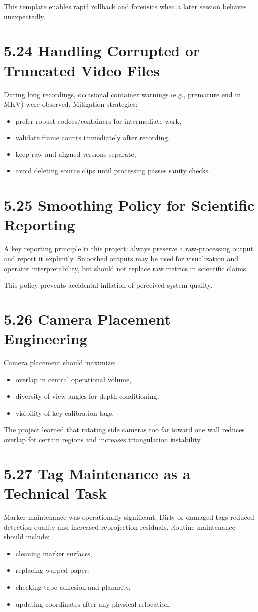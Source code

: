 This template enables rapid rollback and forensics when a later session behaves unexpectedly.

\section{5.24 Handling Corrupted or Truncated Video Files}
During long recordings, occasional container warnings (e.g., premature end in MKV) were observed. Mitigation strategies:
\begin{itemize}
  \item prefer robust codecs/containers for intermediate work,
  \item validate frame counts immediately after recording,
  \item keep raw and aligned versions separate,
  \item avoid deleting source clips until processing passes sanity checks.
\end{itemize}

\section{5.25 Smoothing Policy for Scientific Reporting}
A key reporting principle in this project: always preserve a raw-processing output and report it explicitly. Smoothed outputs may be used for visualization and operator interpretability, but should not replace raw metrics in scientific claims.

This policy prevents accidental inflation of perceived system quality.

\section{5.26 Camera Placement Engineering}
Camera placement should maximize:
\begin{itemize}
  \item overlap in central operational volume,
  \item diversity of view angles for depth conditioning,
  \item visibility of key calibration tags.
\end{itemize}

The project learned that rotating side cameras too far toward one wall reduces overlap for certain regions and increases triangulation instability.

\section{5.27 Tag Maintenance as a Technical Task}
Marker maintenance was operationally significant. Dirty or damaged tags reduced detection quality and increased reprojection residuals. Routine maintenance should include:
\begin{itemize}
  \item cleaning marker surfaces,
  \item replacing warped paper,
  \item checking tape adhesion and planarity,
  \item updating coordinates after any physical relocation.
\end{itemize}

